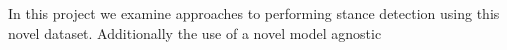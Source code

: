 \documentclass[Dissertation.tex]{subfiles}
\begin{document}
In this project we examine approaches to performing stance detection using this novel dataset. Additionally the use of a novel model agnostic
\begin{comment}

The political landscape of the western world in recent years has changed dramatically. With many nations suffering economic crises and witnessing an influx of refugees fleeing violence and war in the middle east, huge swathes of voters across the western hemisphere are rejecting the prevailing centrist dogma in favour of populist, nationalist, xenophobic right wing movements. In continental Europe nationalist parties now have a significant presence in the governments of Hungary, Poland, Austria, Italy and Germanys 

In America traditional republican candidates lost the primaries to the demagoguery of Donald Trump, while establishment candidate Hillary Clinton failed to energise the centre-left vote%

There are a great number of socio-political and economic factors that can explain the expansion of the far right in Europe and America, but modern technology has almost certainly catalysed its rise to prominence. In particular, this is characterised by two related but opposing phenomena: the democratisation of journalism and the proliferation of hyper-polarized echo-chambers. The hegemony of corporate giants and state broadcasters has been disrupted by the explosion of social media and micro-blogging:  world events are now documented in real time on Twitter and Facebook live streams, and any person with a computer can now publish a blog for the world to read. It is easier than ever to access and consume news from countless different sources, yet Gaughan \cite{gaughanIlliberalDemocracyToxic2017} argues that a toxic mix of fake news, hyperpolarization and electoral manipulation has led to partisan divides being greater than ever. Political opinions are polarized and hardened by ranking algorithms that prioritise sensationalism and emotion over veracity and integrity, while internet hyper connectivity provides radical, fringe viewpoints a platform around which to build communities safe from critical debate. 

Following a a long and bitterly fought political campaign spearheaded by the United Kingdom Independence Party (UKIP), in 2016 the world looked on in shock as Britain voted to leave the EU by national referendum. Drawing many parallels to the election victory of Donald Trump, the Brexit referendum was marked by misinformation, vehement partisanship and an outcome that polls failed to predict.


\end{comment}
\end{document}
